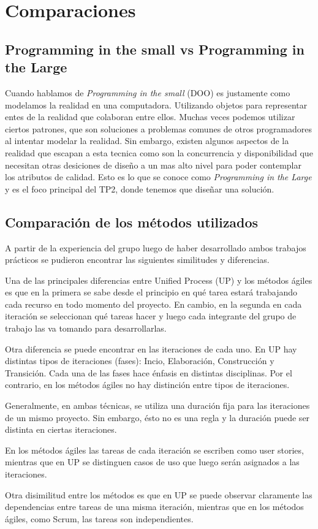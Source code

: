 \section{Comparaciones}

\subsection{Programming in the small vs Programming in the Large}

Cuando hablamos de \textit{Programming in the small} (DOO) es justamente como modelamos la 
realidad en una computadora. Utilizando objetos para representar entes de la 
realidad que colaboran entre ellos. Muchas veces podemos utilizar ciertos 
patrones, que son soluciones a problemas comunes de otros programadores al 
intentar modelar la realidad.
Sin embargo, existen algunos aspectos de la realidad que escapan a esta tecnica como 
son la concurrencia y disponibilidad que necesitan otras desiciones de diseño a 
un mas alto nivel para poder contemplar los atributos de calidad.
Esto es lo que se conoce como \textit{Programming in the Large} y es el foco principal del TP2,
donde tenemos que diseñar una solución.



\subsection{Comparación de los métodos utilizados}

A partir de la experiencia del grupo luego de haber desarrollado ambos trabajos prácticos se
pudieron encontrar las siguientes similitudes y diferencias. 


Una de las principales diferencias entre Unified Process (UP) y los métodos ágiles es que en la primera se sabe
desde el principio en qué tarea estará trabajando cada recurso en todo momento
del proyecto. En cambio, en la segunda en cada iteración se seleccionan qué tareas hacer y luego
cada integrante del grupo de trabajo las va tomando para desarrollarlas.


Otra diferencia se puede encontrar en las iteraciones de cada uno. En UP hay distintas
tipos de iteraciones (fases): Incio, Elaboración, Construcción y Transición. Cada una de las fases hace 
énfasis en distintas disciplinas. Por el contrario, en los métodos ágiles no hay distinción entre tipos 
de iteraciones.


Generalmente, en ambas técnicas, se utiliza una duración fija para las iteraciones de un mismo proyecto. 
Sin embargo, ésto no es una regla y la duración puede ser distinta en ciertas iteraciones.


En los métodos ágiles las tareas de cada iteración se escriben como user stories, mientras que en UP
se distinguen casos de uso que luego serán asignados a las iteraciones.


Otra disimilitud entre los métodos es que en UP se puede observar claramente las dependencias entre
tareas de una misma iteración, mientras que en los métodos ágiles, como Scrum, las tareas son independientes.
